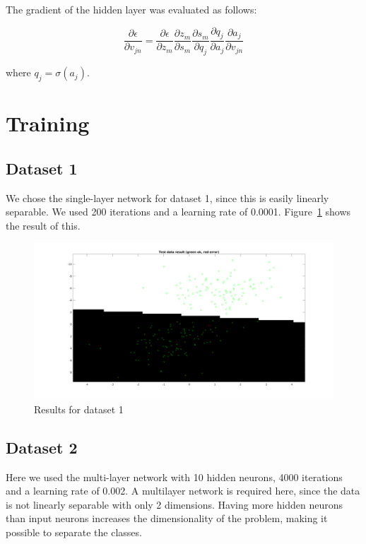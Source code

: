 \documentclass{article}
\begin{document}
The gradient of the hidden layer was evaluated as follows:

\begin{equation}
  \frac{\partial \epsilon}{\partial v_{jn}} =
  \frac{\partial \epsilon}{\partial z_m}
  \frac{\partial z_m}{\partial s_m}
  \frac{\partial s_m}{\partial q_j}
  \frac{\partial q_j}{\partial a_j}
  \frac{\partial a_j}{\partial v_{jn}}
\end{equation}

where $q_j = \sigma(a_j)$.

\section{Training}

\subsection{Dataset 1}

We chose the single-layer network for dataset 1, since this is easily
linearly separable. We used 200 iterations and a learning rate of
0.0001. Figure~\ref{fig:res1} shows the result of this.

\begin{figure}
    \label{fig:res1}
    \includegraphics[width=13cm]{dataset1res.png}
    \caption{Results for dataset 1}
\end{figure}

\subsection{Dataset 2}
Here we used the multi-layer network with 10 hidden neurons, 4000 iterations and a
learning rate of 0.002. A multilayer network is required here, since the data
is not linearly separable with only 2 dimensions. Having more hidden neurons
than input neurons increases the dimensionality of the problem, making it
possible to separate the classes.
\end{document}
